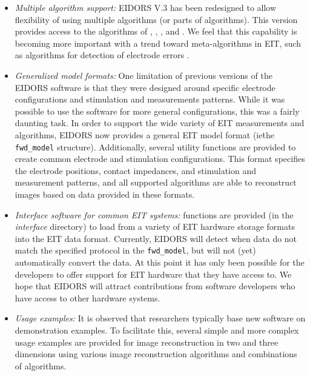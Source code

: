 \documentclass[12pt]{iopart}
\begin{document}
\begin{itemize}

  \item {\em Multiple algorithm support:}
EIDORS V.3 has been redesigned to allow flexibility of
using multiple algorithms (or parts of algorithms). 
This version provides access to the algorithms of
\cite{Adler_and_Guardo_1996}, \cite{Borsic_2002},
\cite{Polydorides_and_Lionheart_2002},
\cite{Soleimani_etal_2005} and \cite{Vauhkonen_etal_2000}.
We feel that this capability is becoming more
important with a trend toward meta-algorithms
in EIT, such as algorithms for detection of
electrode errors \cite{Asfaw_and_Adler_2005}. 

  \item {\em Generalized model formats:}
One limitation of previous versions of the EIDORS software
is that they were designed around specific electrode configurations
and stimulation and measurements patterns. While it was possible
to use the software for more general configurations, this was 
a fairly daunting task. In order to support the wide
variety of EIT measurements and algorithms, EIDORS now provides
a general EIT model format (ie\. the {\tt fwd\_model} structure).
Additionally, several utility functions are provided to
create common electrode and stimulation configurations.
This format specifies the electrode positions, contact impedances,
and stimulation and measurement patterns, and all supported
algorithms are able to reconstruct images based on data
provided in these formats.

  \item {\em Interface software for common EIT systems:}
functions are provided (in the {\em interface} directory) to load
from a variety of EIT hardware storage formats into the
EIT data format. Currently, EIDORS will detect when data
do not match the specified protocol in the {\tt fwd\_model},
but will not (yet) automatically convert the data.
At this point it has only been possible for the developers to 
offer support for EIT hardware that they have access
to. We hope that EIDORS will attract contributions from
software developers who have access to other hardware
systems.

  \item {\em Usage examples:}
It is observed that researchers typically base new software on
demonstration examples. To facilitate this, several simple and more
complex usage examples are provided for image reconstruction
in two and three dimensions using various image reconstruction
algorithms and combinations of algorithms.


\end{itemize}
\end{document}
